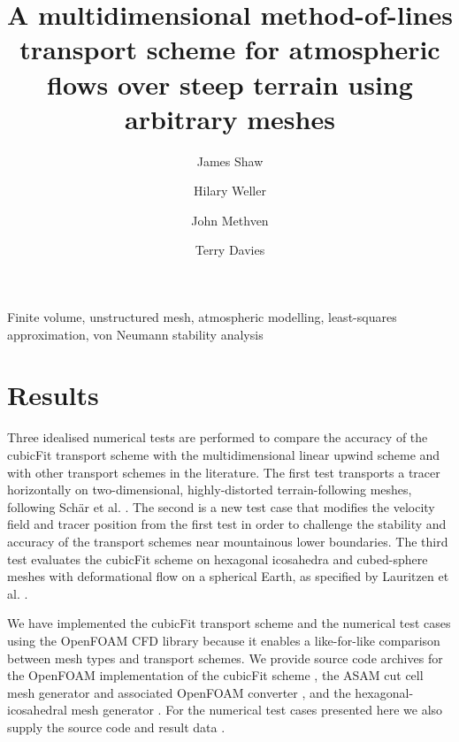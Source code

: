 \documentclass[times]{elsarticle}
\begin{document}
\begin{frontmatter}
\title{A multidimensional method-of-lines transport scheme for atmospheric flows over steep terrain using arbitrary meshes}
\author[uor]{James Shaw}
\author[uor]{Hilary Weller}
\author[uor]{John Methven}
\author[mo]{Terry Davies}

\address[uor]{Department of Meteorology, University of Reading, Reading, United Kingdom}
\address[mo]{Met Office, Exeter, United Kingdom}



\begin{keyword}
	Finite volume, unstructured mesh, atmospheric modelling, least-squares approximation, von Neumann stability analysis
\end{keyword}
\end{frontmatter}





\section{Results}
\label{sec:results}

Three idealised numerical tests are performed to compare the accuracy of the cubicFit transport scheme with the multidimensional linear upwind scheme and with other transport schemes in the literature.  The first test transports a tracer horizontally on two-dimensional, highly-distorted terrain-following meshes, following Sch\"{a}r et al. \citep{schaer2002}.
The second is a new test case that modifies the velocity field and tracer position from the first test in order to challenge the stability and accuracy of the transport schemes near mountainous lower boundaries.
The third test evaluates the cubicFit scheme on hexagonal icosahedra and cubed-sphere meshes with deformational flow on a spherical Earth, as specified by Lauritzen et al. \citep{lauritzen2012}.

We have implemented the cubicFit transport scheme and the numerical test cases using the OpenFOAM CFD library because it enables a like-for-like comparison between mesh types and transport schemes.  We provide source code archives for the OpenFOAM implementation of the cubicFit scheme \citep{atmosfoam}, the ASAM cut cell mesh generator \citep{asam_grid} and associated OpenFOAM converter \citep{gmv2openfoam}, and the hexagonal-icosahedral mesh generator \citep{geodesic-mesh}.  For the numerical test cases presented here we also supply the source code \citep{atmostests} and result data \citep{atmostests-data}.
\end{document}
